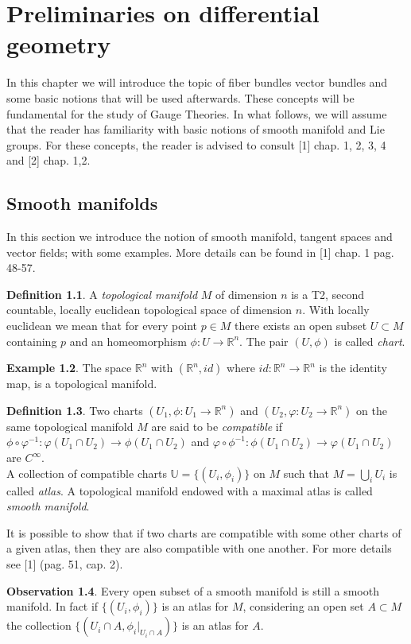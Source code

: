 \documentclass[12pt,a4paper]{report}
\theoremstyle{definition}
\newtheorem{Def}{Definition}[chapter]
\theoremstyle{Theorem}
\theoremstyle{definition}
\newtheorem{Ex}[Def]{Example}
\theoremstyle{definition}
\newtheorem{Obs}[Def]{Observation}
\begin{document}
	\chapter{Preliminaries on differential geometry}
	In this chapter we will introduce the topic of fiber bundles vector bundles and some basic notions that will be used afterwards. These concepts will be fundamental for the study of Gauge Theories. In what follows, we will assume that the reader has familiarity with basic notions of smooth manifold and Lie groups. For these concepts, the reader is advised to consult [1] chap. 1, 2, 3, 4 and [2] chap. 1,2.
	\section{Smooth manifolds}
	In this section we introduce the notion of smooth manifold, tangent spaces and vector fields; with some examples. More details can be found in [1] chap. 1 pag. 48-57.
	\begin{Def}
		A \textit{topological manifold} $M$ of dimension $n$ is a T2, second countable, locally euclidean topological space of dimension $n$. With locally euclidean we mean that for every point $p\in M$ there exists an open subset $U\subset M$ containing $p$ and an homeomorphism $\phi:U\rightarrow\mathbb{R}^n$. The pair $(U,\phi)$ is called \textit{chart}. 
	\end{Def}
	\begin{Ex}
		The space $\mathbb{R}^n$ with $(\mathbb{R}^n, id)$ where $id:\mathbb{R}^n\rightarrow \mathbb{R}^n$ is the identity map, is a topological manifold. 
	\end{Ex}
	\begin{Def}
		Two charts $(U_1,\phi:U_1\rightarrow\mathbb{R}^n)$ and $(U_2,\varphi:U_2\rightarrow\mathbb{R}^n)$ on the same topological manifold $M$ are said to be \textit{compatible} if
		$\phi\circ\varphi^{-1}:\varphi(U_1\cap U_2)\rightarrow \phi(U_1\cap U_2)$ and $\varphi\circ\phi^{-1}:\phi(U_1\cap U_2)\rightarrow \varphi(U_1\cap U_2)$ are $C^\infty$.\\
		A collection of compatible charts $\mathbb{U}=\{(U_i,\phi_{i})\}$ on $M$ such that $M=\bigcup_i U_i$ is called \textit{atlas}. A topological manifold endowed with a maximal atlas is called \textit{smooth manifold}.
	\end{Def}
	It is possible to show that if two charts are compatible with some other charts of a given atlas, then they are also compatible with one another. For more details see [1] (pag. 51, cap. 2).
	\begin{Obs}\label{Obs:1.1.1}
		Every open subset of a smooth manifold is still a smooth manifold. In fact if $\{(U_i,\phi_i)\}$ is an atlas for $M$, considering an open set $A\subset M$ the collection $\{(U_i\cap A,\phi_i|_{U_i\cap A})\}$ is an atlas for $A$.
	\end{Obs}
\end{document}
